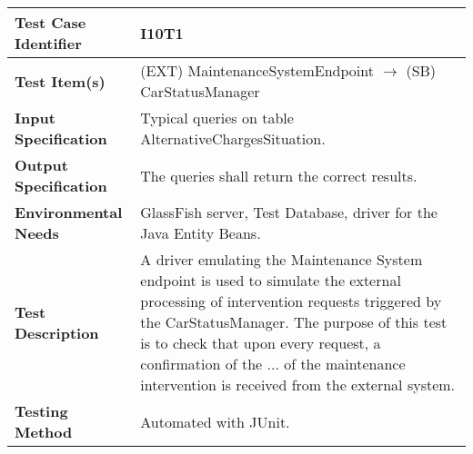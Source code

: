 \begin{longtable}{p{} | p{}}
\hline
\textbf{Test Case Identifier} & I10T1\\
\hline
\textbf{Test Item(s)} & (EXT) MaintenanceSystemEndpoint $\rightarrow$ (SB) CarStatusManager \\
\hline
\textbf{Input Specification} & Typical queries on table AlternativeChargesSituation. \\
\hline
\textbf{Output Specification} & The queries shall return the correct results. \\
\hline
\textbf{Environmental Needs} & GlassFish server, Test Database, driver for the Java Entity Beans. \\
\hline
\textbf{Test Description} & A driver emulating the Maintenance System endpoint is used to simulate the external processing of intervention requests triggered by the CarStatusManager. The purpose of this test is to check that upon every request, a confirmation of the ... of the maintenance intervention is received from the external system. \\
\hline
\textbf{Testing Method} & Automated with JUnit. \\
\hline
\end{longtable}